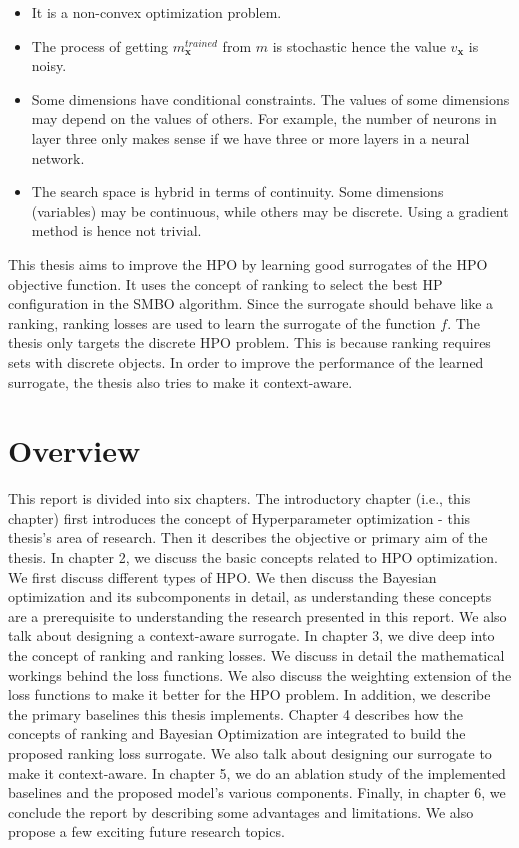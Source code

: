 \documentclass[12pt, twoside, ngerman]{report}
\begin{document}
\begin{itemize}
\item It is a non-convex optimization problem.
\item The process of getting $m^{trained}_\textbf{x}$ from $m$ is stochastic hence the value $v_{\textbf{x}}$ is noisy.
\item Some dimensions have conditional constraints. The values of some dimensions may depend on the values of others. For example, the number of neurons in layer three only makes sense if we have three or more layers in a neural network.
\item The search space is hybrid in terms of continuity. Some dimensions (variables) may be continuous, while others may be discrete.
Using a gradient method is hence not trivial.
\end{itemize}

This thesis aims to improve the HPO by learning good surrogates of the HPO objective function. It uses the concept of ranking to select the best HP configuration in the SMBO algorithm. Since the surrogate should behave like a ranking, ranking losses are used to learn the surrogate of the function $f$. The thesis only targets the discrete HPO problem. This is because ranking requires sets with discrete objects. In order to improve the performance of the learned surrogate, the thesis also tries to make it context-aware.

\label{ProblemOverviewlabel}

\section{Overview}

This report is divided into six chapters. The introductory chapter (i.e., this chapter) first introduces the concept of Hyperparameter optimization - this thesis's area of research. Then it describes the objective or primary aim of the thesis. In chapter 2, we discuss the basic concepts related to HPO optimization. We first discuss different types of HPO. We then discuss the Bayesian optimization and its subcomponents in detail, as understanding these concepts are a prerequisite to understanding the research presented in this report. We also talk about designing a context-aware surrogate. In chapter 3, we dive deep into the concept of ranking and ranking losses. We discuss in detail the mathematical workings behind the loss functions. We also discuss the weighting extension of the loss functions to make it better for the HPO problem. In addition, we describe the primary baselines this thesis implements. Chapter 4 describes how the concepts of ranking and Bayesian Optimization are integrated to build the proposed ranking loss surrogate. We also talk about designing our surrogate to make it context-aware. In chapter 5, we do an ablation study of the implemented baselines and the proposed model's various components. Finally, in chapter 6, we conclude the report by describing some advantages and limitations. We also propose a few exciting future research topics.
\end{document}
